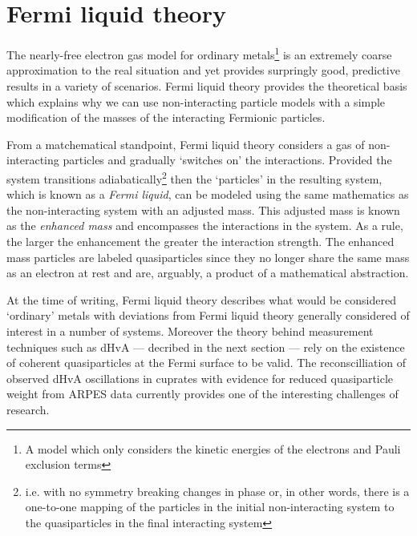 

\section{Fermi liquid theory}

The nearly-free electron gas model for ordinary metals\footnote{A model which only considers the kinetic energies of the electrons and Pauli exclusion terms} is an extremely coarse approximation to the real situation and yet provides surpringly good, predictive results in a variety of scenarios. Fermi liquid theory provides the theoretical basis which explains why we can use non-interacting particle models with a simple modification of the masses of the interacting Fermionic particles.

From a matchematical standpoint, Fermi liquid theory considers a gas of non-interacting particles and gradually `switches on' the interactions. Provided the system transitions adiabatically\footnote{i.e. with no symmetry breaking changes in phase or, in other words, there is a one-to-one mapping of the particles in the initial non-interacting system to the quasiparticles in the final interacting system} then the `particles' in the resulting system, which is known as a \emph{Fermi liquid}, can be modeled using the same mathematics as the non-interacting system with an adjusted mass. This adjusted mass is known as the \emph{enhanced mass} and encompasses the interactions in the system. As a rule, the larger the enhancement the greater the interaction strength. The enhanced mass particles are labeled quasiparticles since they no longer share the same mass as an electron at rest and are, arguably, a product of a mathematical abstraction.

At the time of writing, Fermi liquid theory describes what would be considered `ordinary' metals with deviations from Fermi liquid theory generally considered of interest in a number of systems. Moreover the theory behind measurement techniques such as \ac{dHvA} --- decribed in the next section --- rely on the existence of coherent quasiparticles at the Fermi surface to be valid. The reconscilliation of observed \ac{dHvA} oscillations in cuprates with evidence for reduced quasiparticle weight from \ac{ARPES} data currently provides one of the interesting challenges of \highTc research.
